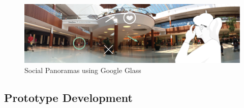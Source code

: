 


\begin{figure}[ht]
	\centering
	\includegraphics[width=\linewidth]{images/ismar14/concept}
	\caption{Social Panoramas using Google Glass}
	\label{fig:ismar14:concept}
\end{figure}

\subsection{Prototype Development}


